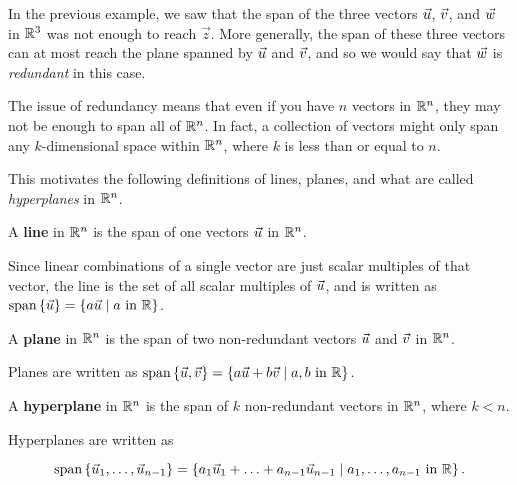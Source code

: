 \documentclass{ximera}
\begin{document}
\begin{exploration}

  In the previous example, we saw that the span of the three vectors $\vec{u}$, $\vec{v}$, and $\vec{w}$ in $\mathbb{R}^3$ was not enough to reach $\vec{z}$. More generally, the span of these three vectors can at most reach the plane spanned by $\vec{u}$ and $\vec{v}$, and so we would say that $\vec{w}$ is \emph{redundant} in this case.

  The issue of redundancy means that even if you have $n$ vectors in $\mathbb{R}^n$, they may not be enough to span all of $\mathbb{R}^n$. In fact, a collection of vectors might only span any $k$-dimensional space within $\mathbb{R}^n$, where $k$ is less than or equal to $n$.

  This motivates the following definitions of lines, planes, and what are called \emph{hyperplanes} in $\mathbb{R}^n$.

  \begin{remark}

  \begin{definition}

    A \textbf{line} in $\mathbb{R}^n$ is the span of one vectors $\vec{u}$ in $\mathbb{R}^n$. 
    
    Since linear combinations of a single vector are just scalar multiples of that vector, the line is the set of all scalar multiples of $\vec{u}$, and is written as $\text{span}\left\{\vec{u}\right\}=\left\{a\vec{u}\mid a\text{ in }\mathbb{R}\right\}$.

  \end{definition}

  \begin{definition}

    A \textbf{plane} in $\mathbb{R}^n$ is the span of two  non-redundant vectors $\vec{u}$ and $\vec{v}$ in $\mathbb{R}^n$. 
    
    Planes are written as $\text{span}\left\{\vec{u},\vec{v}\right\}=\left\{a\vec{u}+b\vec{v}\mid a,b\text{ in }\mathbb{R}\right\}$.

  \end{definition}

  \begin{definition}

    A \textbf{hyperplane} in $\mathbb{R}^n$ is the span of $k$ non-redundant vectors in $\mathbb{R}^n$, where $k< n$. 
    
    Hyperplanes are written as 
    
    $$\text{span}\left\{\vec{u}_1,\ldots,\vec{u}_{n-1}\right\}=\left\{a_1\vec{u}_1+\ldots+a_{n-1}\vec{u}_{n-1}\mid a_1,\ldots,a_{n-1}\text{ in }\mathbb{R}\right\}.$$


\end{definition}
\end{remark}
\end{exploration}
\end{document}

